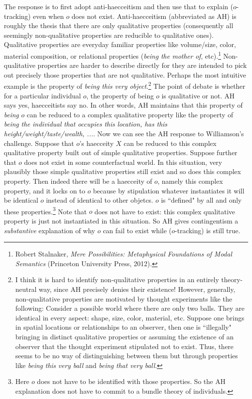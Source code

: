 The response is to first adopt anti-haecceitism and then use that to explain ($o$-tracking) even when $o$ does not exist. Anti-haecceitism (abbreviated as AH) is roughly the thesis that there are only qualitative properties (consequently all seemingly non-qualitative properties are reducible to qualitative ones). Qualitative properties are everyday familiar properties like volume/size, color, material composition, or relational properties (\emph{being the mother of}, etc).\footnote{Robert Stalnaker, \textit{Mere Possibilities: Metaphysical Foundations of Modal Semantics} (Princeton University Press, 2012).} Non-qualitative properties are harder to describe directly for they are intended to pick out precisely those properties that are not qualitative. Perhaps the most intuitive example is the property of \emph{being this very object}.\footnote{I think it is hard to identify non-qualitative properties in an entirely theory-neutral way, since AH precisely denies their existence! However, generally, non-qualitative properties are motivated by thought experiments like the following: Consider a possible world where there are only two balls. They are identical in every aspect: shape, size, color, material, etc. Suppose one brings in spatial locations or relationships to an observer, then one is ``illegally" bringing in distinct qualitative properties or assuming the existence of an observer that the thought experiment stipulated not to exist. Thus, there seems to be no way of distinguishing between them but through properties like \emph{being this very ball} and \emph{being that very ball}. }
The point of debate is whether for a particular individual $o$, the property of being $o$ is qualitative or not. AH says yes, haecceitists say no. In other words, AH maintains that this property of \emph{being $o$} can be reduced to a complex qualitative property like the property of \emph{being the individual that occupies this location, has this height/weight/taste/wealth, ...}. 
Now we can see the AH response to Williamson's challenge. Suppose that $o$'s haecceity $X$ can be reduced to this complex qualitative property built out of simple qualitative properties. Suppose further that $o$ does not exist in some counterfactual world. In this situation, very plausibly those simple qualitative properties still exist and so does this complex property. Then indeed there will be a haecceity of $o$, namely this complex property, and it locks on to $o$ because by stipulation whatever instantiates it will be identical $o$ instead of identical to other objetcs. $o$ is ``defined" by all and only these properties.\footnote{Here $o$ does not have to be identified with those properties. So the AH explanation does not have to commit to a bundle theory of individuals.} Note that $o$ does not have to exist: this complex qualitative property is just not instantiated in this situation. So AH gives contingentism a \emph{substantive} explanation of why $o$ can fail to exist while ($o$-tracking) is still true. 


